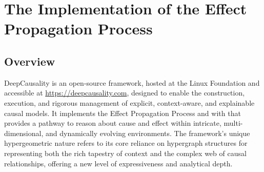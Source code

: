 
\section{The Implementation of the Effect Propagation Process}
\label{sec:implementation}

\subsection{Overview}
\label{sec:implementation_overview}

DeepCausality is an open-source framework, hosted at the Linux Foundation and accessible at \url{https://deepcausality.com}, designed to enable the construction, execution, and rigorous management of explicit, context-aware, and explainable causal models. It implements the Effect Propagation Process and with that provides a pathway to reason about cause and effect within intricate, multi-dimensional, and dynamically evolving environments. 
The framework's unique hypergeometric nature refers to its core reliance on hypergraph structures for representing both the rich tapestry of context and the complex web of causal relationships,
offering a new level of expressiveness and analytical depth.

